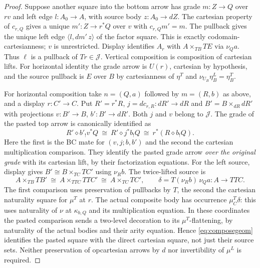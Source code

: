 \documentclass[11pt]{article}
\theoremstyle{definition}
\newcommand{\J}{\mathcal J}
\begin{document}
\begin{proof}
Suppose another square into the bottom arrow has grade $m:Z\to Q$
over $rv$ and left edge $l:A_0\to A$, with source body $z:A_0\to dZ$.
The cartesian property of $c_{r,Q}$ gives a unique $m':Z\to r^*Q$
over $v$ with $c_{r,Q}m'=m$. The pullback gives the unique left
edge $\langle l,dm'\,z\rangle$ of the factor square. This is exactly
codomain-cartesianness; $v$ is unrestricted. Display identifies
$A_r$ with $A\times_{TB}TE$ via $\nu_Q a$. Thus $\ell$ is a
pullback of $Tr\in\J$. Vertical composition is composition of
cartesian lifts. For horizontal identity the grade arrow is $U(r)$,
cartesian by hypothesis, and the source pullback is $E$ over $B$
by cartesianness of $\eta^T$ and $\nu_{U_B}\eta^L_B=\eta^T_B$.

For horizontal composition take $n=(Q,a)$ followed by $m=(R,b)$ as
above, and a display $r:C'\to C$. Put $R'=r^*R$,
$j=d c_{r,R}:dR'\to dR$ and
$B'=B\times_{dR}dR'$ with projections $v:B'\to B$, $b':B'\to dR'$.
Both $j$ and $v$ belong to $\J$. The grade of the pasted top arrow is
canonically identified as
\[
 R'\diamond b'_!v^*Q
 \ \cong\ R'\diamond j^*b_!Q
 \ \cong\ r^*(R\diamond b_!Q).
\]
Here the first is the BC mate for $(v,j;b,b')$ and the second the
cartesian multiplication comparison. They identify the pasted grade
arrow \emph{over the original grade} with its cartesian lift, by their
factorization equations. For the left source, display gives
$B'\cong B\times_{TC}TC'$ using $\nu_R b$. The twice-lifted source is
\begin{equation}
 A\times_{TB}TB'\ \cong\ A\times_{TTC}TTC'
 \ \cong\ A\times_{TC}TC',
 \qquad \delta=T(\nu_R b)\,\nu_Q a:A\to TTC .
 \label{eq:composegeom}
\end{equation}
The first comparison uses preservation of pullbacks by $T$, the
second the cartesian naturality square for $\mu^T$ at $r$. The actual
composite body has occurrence $\mu^T_C\delta$: this uses naturality
of $\nu$ at $\kappa_{b,Q}$ and its multiplication equation. In these
coordinates the pasted comparison sends a two-level decoration to
its $\mu^T$-flattening, by naturality of the actual bodies and their
arity equation. Hence \eqref{eq:composegeom} identifies the pasted
square with the direct cartesian square, not just their source sets.
Neither preservation of opcartesian arrows by $d$ nor invertibility
of $\mu^L$ is required.
\end{proof}
\end{document}
